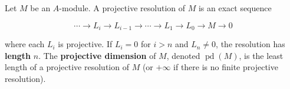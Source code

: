 Let $M$ be an $A$-module. A projective resolution of $M$ is an exact sequence

$$\cdots \to L_i \to L_{i-1} \to \cdots \to L_1 \to L_0 \to M \to 0$$

where each $L_i$ is projective. If $L_i = 0$ for $i > n$ and $L_n \neq 0$, the resolution has \textbf{length} $n$. The \textbf{projective dimension} of $M$, denoted $\operatorname{pd}(M)$, is the least length of a projective resolution of $M$ (or $+\infty$ if there is no finite projective resolution).
